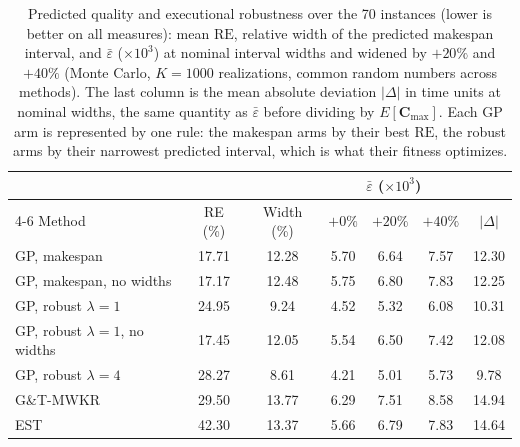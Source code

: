 \documentclass[review,authoryear,11pt]{elsarticle}
\newcommand{\rev}[1]{\textcolor{revcolor}{#1}}
\newcommand{\RE}{\mathrm{RE}}
\begin{document}
\begin{table}[t]
\centering\small
\setlength{\tabcolsep}{4pt}
\caption{Predicted quality and executional robustness over the 70
instances (lower is better on all measures): mean $\RE$, relative width
of the predicted makespan interval, and $\bar\varepsilon$
($\times10^3$) at nominal interval widths and widened by $+20\%$ and
$+40\%$ (Monte Carlo, $K{=}1000$ realizations, common random numbers
across methods). \rev{The last column is the mean absolute deviation
$|\Delta|$ in time units at nominal widths, the same quantity as
$\bar\varepsilon$ before dividing by $E[\mathbf{C}_{\max}]$.} Each GP arm is
represented by one rule: the makespan arms by their best $\RE$, the
robust arms by their narrowest predicted interval, which is what their
fitness optimizes.}
\label{tab:robustness}
\begin{tabular}{lcccccc}
\toprule
& & & \multicolumn{3}{c}{$\bar\varepsilon$ ($\times10^3$)} & \\
\cmidrule(lr){4-6}
Method & RE (\%) & Width (\%) & $+0\%$ & $+20\%$ & $+40\%$ &
\rev{$|\Delta|$} \\
\midrule
GP, makespan & 17.71 & 12.28 & 5.70 & 6.64 & 7.57 & \rev{12.30} \\
GP, makespan, no widths & 17.17 & 12.48 & 5.75 & 6.80 & 7.83 &
\rev{12.25} \\
GP, robust $\lambda{=}1$ & 24.95 & 9.24 & 4.52 & 5.32 & 6.08 &
\rev{10.31} \\
GP, robust $\lambda{=}1$, no widths & 17.45 & 12.05 & 5.54 & 6.50 & 7.42 &
\rev{12.08} \\
GP, robust $\lambda{=}4$ & 28.27 & 8.61 & 4.21 & 5.01 & 5.73 &
\rev{9.78} \\
\midrule
G\&T-MWKR & 29.50 & 13.77 & 6.29 & 7.51 & 8.58 & \rev{14.94} \\
EST & 42.30 & 13.37 & 5.66 & 6.79 & 7.83 & \rev{14.64} \\
\bottomrule
\end{tabular}
\end{table}
\end{document}
